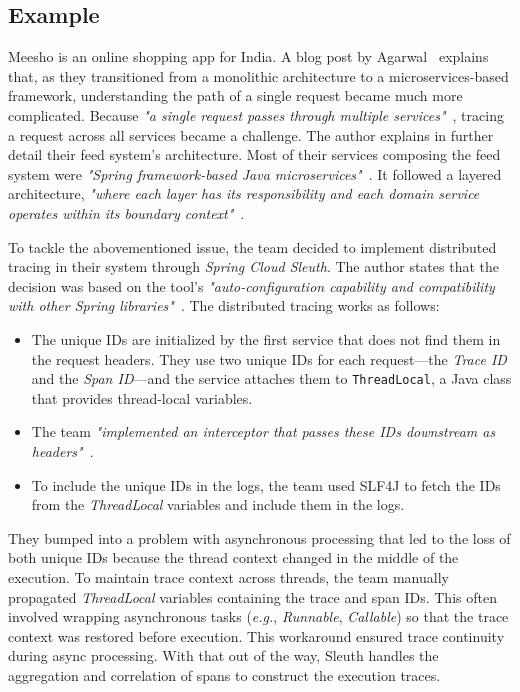 \documentclass[runningheads]{llncs}
\begin{document}
\subsection{Example}
Meesho is an online shopping app for India. A blog post by Agarwal~\cite{Agarwal-2022} explains that, as they transitioned from a monolithic architecture to a microservices-based framework, understanding the path of a single request became much more complicated. Because \textit{"a single request passes through multiple services"}~\cite{Agarwal-2022}, tracing a request across all services became a challenge. The author explains in further detail their feed system's architecture. Most of their services composing the feed system were \textit{"Spring framework-based Java microservices"}~\cite{Agarwal-2022}. It followed a layered architecture, \textit{"where each layer has its responsibility and each domain service operates within its boundary context"}~\cite{Agarwal-2022}. 

To tackle the abovementioned issue, the team decided to implement distributed tracing in their system through \textit{Spring Cloud Sleuth}. The author states that the decision was based on the tool's \textit{"auto-configuration capability and compatibility with other Spring libraries"}~\cite{Agarwal-2022}. The distributed tracing works as follows:
\begin{itemize}
    \item The unique IDs are initialized by the first service that does not find them in the request headers. They use two unique IDs for each request---the \textit{Trace ID} and the \textit{Span ID}---and the service attaches them to \texttt{ThreadLocal}, a Java class that provides thread-local variables.
    \item The team \textit{"implemented an interceptor that passes these IDs downstream as headers"}~\cite{Agarwal-2022}.
    \item To include the unique IDs in the logs, the team used SLF4J to fetch the IDs from the \textit{ThreadLocal} variables and include them in the logs.
\end{itemize}

They bumped into a problem with asynchronous processing that led to the loss of both unique IDs because the thread context changed in the middle of the execution. To maintain trace context across threads, the team manually propagated \textit{ThreadLocal} variables containing the trace and span IDs. This often involved wrapping asynchronous tasks (\textit{e.g.}, \textit{Runnable}, \textit{Callable}) so that the trace context was restored before execution. This workaround ensured trace continuity during async processing. With that out of the way, Sleuth handles the aggregation and correlation of spans to construct the execution traces.
\end{document}
